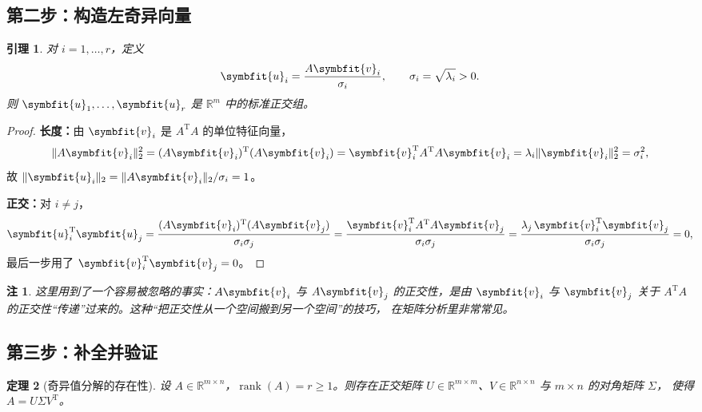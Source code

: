 \documentclass[UTF8, 11pt, a4paper, fontset=windows]{ctexart}
\theoremstyle{cnthm}
\newtheorem{thm}{定理}[section]
\newtheorem{lemma}[thm]{引理}
\theoremstyle{cndef}
\newtheorem{rem}[defn]{注}
\newcommand{\T}{^{\mathrm{T}}}
\newcommand{\R}{\mathbb{R}}
\newcommand{\nrm}[1]{\lVert #1 \rVert}
\DeclareMathOperator{\rank}{rank}
\newcommand{\bu}{\symbfit{u}}
\newcommand{\vv}{\symbfit{v}}
\begin{document}
\subsection{第二步：构造左奇异向量}

\begin{lemma}\label{lem:u-orth}
对 $i=1,\dots,r$，定义
\begin{equation}
  \bu_i=\frac{A\vv_i}{\sigma_i},\qquad \sigma_i=\sqrt{\lambda_i}>0 .
\end{equation}
则 $\bu_1,\dots,\bu_r$ 是 $\R^m$ 中的标准正交组。
\end{lemma}

\begin{proof}
\textbf{长度：}由 $\vv_i$ 是 $A\T A$ 的单位特征向量，
\begin{equation}
  \nrm{A\vv_i}_2^2=(A\vv_i)\T(A\vv_i)=\vv_i\T A\T A\vv_i=\lambda_i\nrm{\vv_i}_2^2=\sigma_i^2 ,
\end{equation}
故 $\nrm{\bu_i}_2=\nrm{A\vv_i}_2/\sigma_i=1$。

\textbf{正交：}对 $i\neq j$，
\begin{equation}
  \bu_i\T\bu_j=\frac{(A\vv_i)\T(A\vv_j)}{\sigma_i\sigma_j}
  =\frac{\vv_i\T A\T A\vv_j}{\sigma_i\sigma_j}
  =\frac{\lambda_j\,\vv_i\T\vv_j}{\sigma_i\sigma_j}=0,
\end{equation}
最后一步用了 $\vv_i\T\vv_j=0$。
\end{proof}

\begin{rem}
这里用到了一个容易被忽略的事实：$A\vv_i$ 与 $A\vv_j$ 的正交性，是由 $\vv_i$ 与 $\vv_j$
关于 $A\T A$ 的正交性“传递”过来的。这种“把正交性从一个空间搬到另一个空间”的技巧，
在矩阵分析里非常常见。
\end{rem}

\subsection{第三步：补全并验证}

\begin{thm}[奇异值分解的存在性]\label{thm:svd-exist}
设 $A\in\R^{m\times n}$，$\rank(A)=r\ge1$。则存在正交矩阵
$U\in\R^{m\times m}$、$V\in\R^{n\times n}$ 与 $m\times n$ 的对角矩阵 $\Sigma$，
使得 $A=U\Sigma V\T$。
\end{thm}
\end{document}
